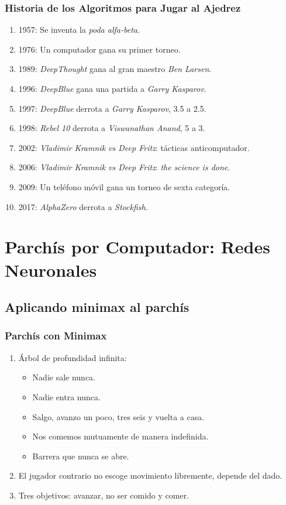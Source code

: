 \documentclass[a4paper,t,xcolor=pst,dvips,colortheme]{beamer}
\begin{document}
\begin{frame}[c]
    \frametitle{Historia de los Algoritmos para Jugar al Ajedrez}
    \begin{enumerate}[<+->]
        \item 1957: Se inventa la \emph{poda alfa-beta}.
        \item 1976: Un computador gana su primer torneo.
        \item 1989: \emph{DeepThought} gana al gran maestro \emph{Ben Larsen}.
        \item 1996: \emph{DeepBlue} gana una partida a \emph{Garry Kasparov}.
        \item 1997: \emph{DeepBlue} derrota a \emph{Garry Kasparov}, 3.5 a 2.5.
        \item 1998: \emph{Rebel 10} derrota a \emph{Viswanathan Anand}, 5 a 3.
        \item 2002: \emph{Vladimir Kramnik vs Deep Fritz}: tácticas anticomputador.
        \item 2006: \emph{Vladimir Kramnik vs Deep Fritz}: \emph{the science is done}.
        \item 2009: Un teléfono móvil gana un torneo de sexta categoría.
        \item 2017: \emph{AlphaZero} derrota a \emph{Stockfish}.
    \end{enumerate}
\end{frame}

\section{Parchís por Computador: Redes Neuronales}

\subsection{Aplicando minimax al parchís}

\begin{frame}[c]
    \frametitle{Parchís con Minimax}
    \begin{enumerate}[<+->]
        \item Árbol de profundidad infinita:
        \begin{itemize}
            \item Nadie sale nunca.
            \item Nadie entra nunca.
            \item Salgo, avanzo un poco, tres seis y vuelta a casa.
            \item Nos comemos mutuamente de manera indefinida.
            \item Barrera que nunca se abre.
        \end{itemize}
        \item El jugador contrario no escoge movimiento libremente, depende del dado.
        \item Tres objetivos: avanzar, no ser comido y comer.
    \end{enumerate}
\end{frame}
\end{document}
